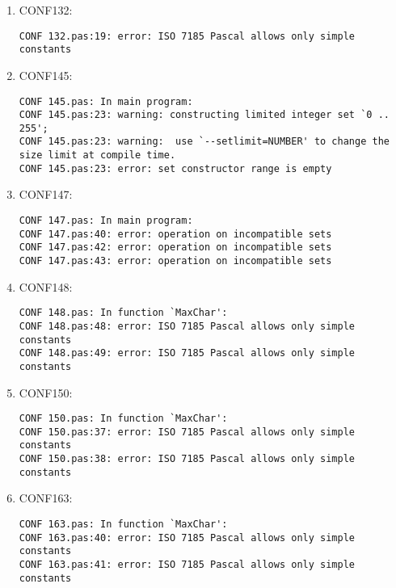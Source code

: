 \documentclass[a4paper]{article}
\begin{document}
\begin{enumerate}
    \item CONF132:
        \begin{small}\begin{verbatim}
CONF 132.pas:19: error: ISO 7185 Pascal allows only simple constants
        \end{verbatim}\end{small}

    \item CONF145:
        \begin{small}\begin{verbatim}
CONF 145.pas: In main program:
CONF 145.pas:23: warning: constructing limited integer set `0 .. 255';
CONF 145.pas:23: warning:  use `--setlimit=NUMBER' to change the size limit at compile time.
CONF 145.pas:23: error: set constructor range is empty
        \end{verbatim}\end{small}

    \item CONF147:
        \begin{small}\begin{verbatim}
CONF 147.pas: In main program:
CONF 147.pas:40: error: operation on incompatible sets
CONF 147.pas:42: error: operation on incompatible sets
CONF 147.pas:43: error: operation on incompatible sets
        \end{verbatim}\end{small}

    \item CONF148:
        \begin{small}\begin{verbatim}
CONF 148.pas: In function `MaxChar':
CONF 148.pas:48: error: ISO 7185 Pascal allows only simple constants
CONF 148.pas:49: error: ISO 7185 Pascal allows only simple constants
        \end{verbatim}\end{small}

    \item CONF150:
        \begin{small}\begin{verbatim}
CONF 150.pas: In function `MaxChar':
CONF 150.pas:37: error: ISO 7185 Pascal allows only simple constants
CONF 150.pas:38: error: ISO 7185 Pascal allows only simple constants
        \end{verbatim}\end{small}

    \item CONF163:
        \begin{small}\begin{verbatim}
CONF 163.pas: In function `MaxChar':
CONF 163.pas:40: error: ISO 7185 Pascal allows only simple constants
CONF 163.pas:41: error: ISO 7185 Pascal allows only simple constants
        \end{verbatim}\end{small}


\end{enumerate}
\end{document}
